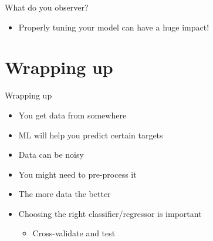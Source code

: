\documentclass[obeyspaces,aspectratio=43]{beamer}
\providecommand{\tightlist}{%
  \setlength{\itemsep}{0pt}\setlength{\parskip}{0pt}}
\begin{document}
\begin{frame}{What do you observer?}

\begin{itemize}
\tightlist
\item
  Properly tuning your model can have a huge impact!
\end{itemize}

\end{frame}

\section{Wrapping up}\label{wrapping-up}

\begin{frame}{Wrapping up}

\begin{itemize}
\tightlist
\item
  You get data from somewhere
\item
  ML will help you predict certain targets
\item
  Data can be noisy
\item
  You might need to pre-process it
\item
  The more data the better
\item
  Choosing the right classifier/regressor is important

  \begin{itemize}
  \tightlist
  \item
    Cross-validate and test
  \end{itemize}
\end{itemize}

\end{frame}
\end{document}
